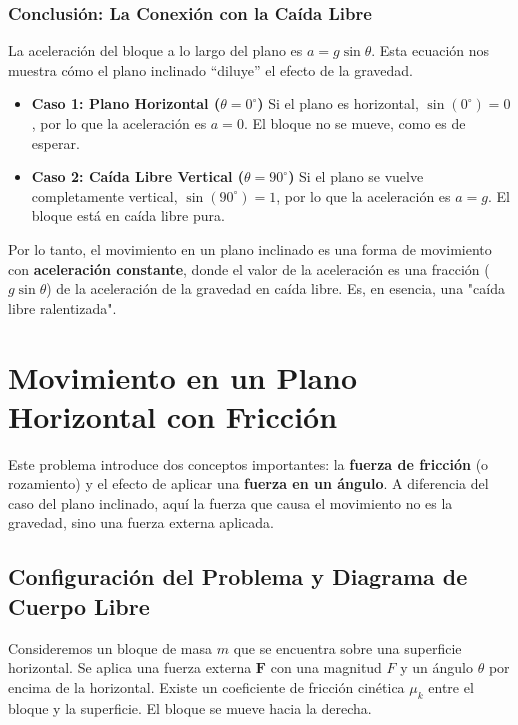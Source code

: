 \documentclass[11pt,a4paper]{book}
\begin{document}
\subsubsection{Conclusión: La Conexión con la Caída Libre}

La aceleración del bloque a lo largo del plano es $a = g \sin\theta$. Esta ecuación nos muestra cómo el plano inclinado ``diluye'' el efecto de la gravedad.

\begin{itemize}
    \item \textbf{Caso 1: Plano Horizontal ($\theta = 0^\circ$)}
    Si el plano es horizontal, $\sin(0^\circ) = 0$, por lo que la aceleración es $a=0$. El bloque no se mueve, como es de esperar.

    \item \textbf{Caso 2: Caída Libre Vertical ($\theta = 90^\circ$)}
    Si el plano se vuelve completamente vertical, $\sin(90^\circ) = 1$, por lo que la aceleración es $a=g$. El bloque está en caída libre pura.
\end{itemize}

Por lo tanto, el movimiento en un plano inclinado es una forma de movimiento con \textbf{aceleración constante}, donde el valor de la aceleración es una fracción ($g \sin\theta$) de la aceleración de la gravedad en caída libre. Es, en esencia, una "caída libre ralentizada".


\section{Movimiento en un Plano Horizontal con Fricción}

Este problema introduce dos conceptos importantes: la \textbf{fuerza de fricción} (o rozamiento) y el efecto de aplicar una \textbf{fuerza en un ángulo}. A diferencia del caso del plano inclinado, aquí la fuerza que causa el movimiento no es la gravedad, sino una fuerza externa aplicada.

\subsection*{Configuración del Problema y Diagrama de Cuerpo Libre}

Consideremos un bloque de masa $m$ que se encuentra sobre una superficie horizontal. Se aplica una fuerza externa $\boldsymbol{F}$ con una magnitud $F$ y un ángulo $\theta$ por encima de la horizontal. Existe un coeficiente de fricción cinética $\mu_k$ entre el bloque y la superficie. El bloque se mueve hacia la derecha.
\end{document}
